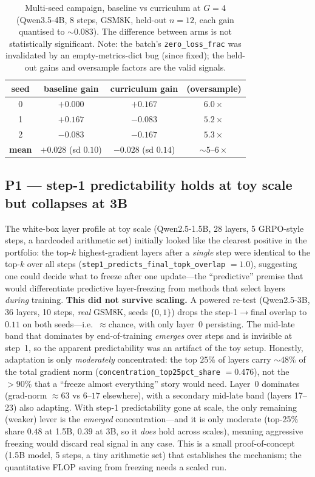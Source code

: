 \documentclass[12pt,a4paper]{report}
\begin{document}
\begin{table}[t]
\centering
\small
\begin{tabular}{@{}cccc@{}}
\toprule
seed & baseline gain & curriculum gain & (oversample) \\
\midrule
0 & $+0.000$ & $+0.167$ & $6.0\times$ \\
1 & $+0.167$ & $-0.083$ & $5.2\times$ \\
2 & $-0.083$ & $-0.167$ & $5.3\times$ \\
\midrule
\textbf{mean} & $\mathbf{+0.028}$ (sd $0.10$) & $\mathbf{-0.028}$ (sd $0.14$) & ${\sim}5$--$6\times$ \\
\bottomrule
\end{tabular}
\caption{Multi-seed campaign, baseline vs curriculum at $G{=}4$ (Qwen3.5-4B,
8 steps, GSM8K, held-out $n=12$, each gain quantised to ${\sim}0.083$). The
difference between arms is not statistically significant. Note: the batch's
\texttt{zero\_loss\_frac} was invalidated by an empty-metrics-dict bug (since
fixed); the held-out gains and oversample factors are the valid signals.}
\label{tab:campaign}
\end{table}

\subsection{P1 --- step-1 predictability holds at toy scale but collapses at 3B}

The white-box layer profile at toy scale (Qwen2.5-1.5B, 28 layers, 5 GRPO-style
steps, a hardcoded arithmetic set) initially looked like the clearest positive in
the portfolio: the top-$k$ highest-gradient layers after a \emph{single} step were
identical to the top-$k$ over all steps (\texttt{step1\_predicts\_final\_topk\_overlap}
$=1.0$), suggesting one could decide what to freeze after one update---the
``predictive'' premise that would differentiate predictive layer-freezing from
methods that select layers \emph{during} training. \textbf{This did not survive
scaling.} A powered re-test (Qwen2.5-3B, 36 layers, 10 steps, \emph{real} GSM8K,
seeds $\{0,1\}$) drops the step-1$\to$final overlap to $0.11$ on both seeds---i.e.\
${\approx}$chance, with only layer~0 persisting. The mid-late band that dominates by
end-of-training \emph{emerges} over steps and is invisible at step~1, so the apparent
predictability was an artifact of the toy setup. Honestly, adaptation is only
\emph{moderately} concentrated: the top $25\%$ of layers carry ${\sim}48\%$ of the
total gradient norm (\texttt{concentration\_top25pct\_share} $=0.476$), not the
$>90\%$ that a ``freeze almost everything'' story would need. Layer~0 dominates
(grad-norm $\approx 63$ vs $6$--$17$ elsewhere), with a secondary mid-late band
(layers 17--23) also adapting. With step-1 predictability gone at scale, the only remaining (weaker) lever is the
\emph{emerged} concentration---and it is only moderate (top-25\% share $0.48$ at 1.5B,
$0.39$ at 3B, so it \emph{does} hold across scales), meaning aggressive freezing would
discard real signal in any case. This is a small proof-of-concept
(1.5B model, 5 steps, a tiny arithmetic set) that establishes the mechanism; the
quantitative FLOP saving from freezing needs a scaled run.
\end{document}
